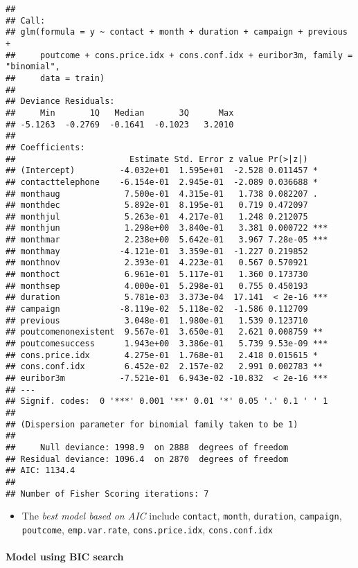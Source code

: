 \documentclass[
]{article}
\providecommand{\tightlist}{%
  \setlength{\itemsep}{0pt}\setlength{\parskip}{0pt}}
\begin{document}
\begin{verbatim}
## 
## Call:
## glm(formula = y ~ contact + month + duration + campaign + previous + 
##     poutcome + cons.price.idx + cons.conf.idx + euribor3m, family = "binomial", 
##     data = train)
## 
## Deviance Residuals: 
##     Min       1Q   Median       3Q      Max  
## -5.1263  -0.2769  -0.1641  -0.1023   3.2010  
## 
## Coefficients:
##                       Estimate Std. Error z value Pr(>|z|)    
## (Intercept)         -4.032e+01  1.595e+01  -2.528 0.011457 *  
## contacttelephone    -6.154e-01  2.945e-01  -2.089 0.036688 *  
## monthaug             7.500e-01  4.315e-01   1.738 0.082207 .  
## monthdec             5.892e-01  8.195e-01   0.719 0.472097    
## monthjul             5.263e-01  4.217e-01   1.248 0.212075    
## monthjun             1.298e+00  3.840e-01   3.381 0.000722 ***
## monthmar             2.238e+00  5.642e-01   3.967 7.28e-05 ***
## monthmay            -4.121e-01  3.359e-01  -1.227 0.219852    
## monthnov             2.393e-01  4.223e-01   0.567 0.570921    
## monthoct             6.961e-01  5.117e-01   1.360 0.173730    
## monthsep             4.000e-01  5.298e-01   0.755 0.450193    
## duration             5.781e-03  3.373e-04  17.141  < 2e-16 ***
## campaign            -8.119e-02  5.118e-02  -1.586 0.112709    
## previous             3.048e-01  1.980e-01   1.539 0.123710    
## poutcomenonexistent  9.567e-01  3.650e-01   2.621 0.008759 ** 
## poutcomesuccess      1.943e+00  3.386e-01   5.739 9.53e-09 ***
## cons.price.idx       4.275e-01  1.768e-01   2.418 0.015615 *  
## cons.conf.idx        6.452e-02  2.157e-02   2.991 0.002783 ** 
## euribor3m           -7.521e-01  6.943e-02 -10.832  < 2e-16 ***
## ---
## Signif. codes:  0 '***' 0.001 '**' 0.01 '*' 0.05 '.' 0.1 ' ' 1
## 
## (Dispersion parameter for binomial family taken to be 1)
## 
##     Null deviance: 1998.9  on 2888  degrees of freedom
## Residual deviance: 1096.4  on 2870  degrees of freedom
## AIC: 1134.4
## 
## Number of Fisher Scoring iterations: 7
\end{verbatim}

\begin{itemize}
\tightlist
\item
  The \emph{best model based on AIC} include \texttt{contact},
  \texttt{month}, \texttt{duration}, \texttt{campaign},
  \texttt{poutcome}, \texttt{emp.var.rate}, \texttt{cons.price.idx},
  \texttt{cons.conf.idx}
\end{itemize}

\hypertarget{model-using-bic-search}{%
\paragraph{Model using BIC search}\label{model-using-bic-search}}
\end{document}
